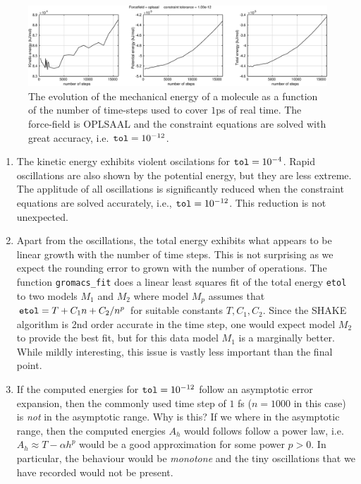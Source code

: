 \documentclass[runningheads]{llncs}
\begin{document}
\begin{figure}
  \centering
  \includegraphics[width=12cm]{oplsaaltol12.pdf}
   \caption{The evolution of the mechanical energy of a molecule as a function of the number of time-steps used to cover $1$ps of real time. The force-field is OPLSAAL and the constraint equations are solved with great accuracy, i.e. ${\tt tol} = 10^{-12}$.} \label{fig:oplsaaltol12}
\end{figure}






\begin{enumerate}
\item The kinetic energy exhibits violent oscilations for ${\tt tol} = 10^{-4}$. Rapid oscillations are also shown by the potential energy, but they are less extreme. The applitude of all oscillations is significantly reduced when the constraint equations are solved accurately, i.e., ${\tt tol} = 10^{-12}$. This reduction is not unexpected.
\item Apart from the oscillations, the total energy exhibits what appears to be linear growth with the number of time steps. This is not surprising as we expect the rounding error to grown with the number of operations. The function {\tt gromacs\_fit} does a linear least squares fit of the total energy {\tt etol} to two models $M_1$ and $M_2$ where model $M_p$ assumes that ${\tt etol} = T + C_1n + C_2/n^p$ for suitable constants $T, C_1, C_2$. Since the SHAKE algorithm is 2nd order accurate in the time step, one would expect model $M_2$ to provide the best fit, but for this data model $M_1$ is a marginally better. While mildly interesting, this issue is vastly less important than the final point.
\item If the computed energies for ${\tt tol} = 10 ^{-12}$ follow an asymptotic error expansion, then the commonly used time step of $1$ fs ($n=1000$ in this case) is \emph{not} in the asymptotic range. Why is this? If we where in the asymptotic range, then the computed energies $A_h$ would follows follow a power law, i.e. $A_h \approx T - \alpha h^p$ would be a good approximation for some power $p>0$. In particular, the behaviour would be \emph{monotone} and the tiny oscillations that we have recorded would not be present.
\end{enumerate}
\end{document}
